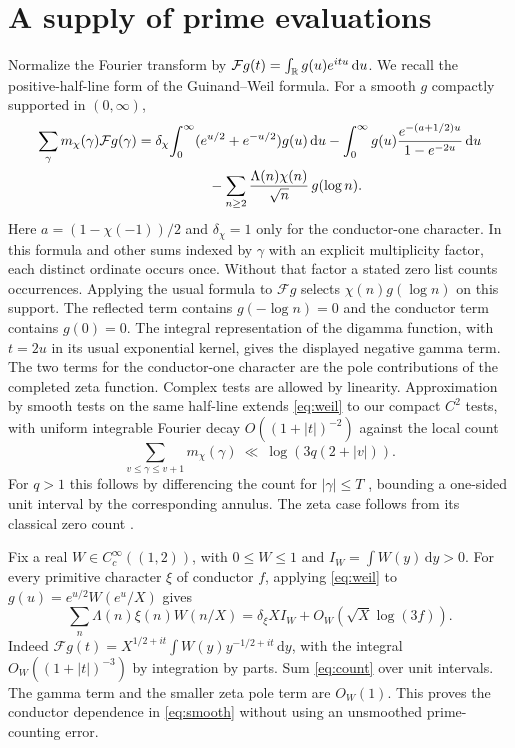 \documentclass[11pt,letterpaper]{article}
\newcommand{\F}{\mathcal F}\newcommand{\Pp}{\mathcal P}
\newcommand{\dd}{\,\mathrm d}
\begin{document}
\section{A supply of prime evaluations}
Normalize the Fourier transform by $\F g(t)=\int_{\R} g(u)e^{itu}\dd u$. We recall the positive-half-line form of the Guinand--Weil formula. For a smooth $g$ compactly supported in $(0,\infty)$,
\begin{align}
 \sum_\gamma m_\chi(\gamma)\F g(\gamma)
 &=\delta_\chi\!\int_0^\infty (e^{u/2}+e^{-u/2})g(u)\dd u
 -\int_0^\infty g(u)\frac{e^{-(a+1/2)u}}{1-e^{-2u}}\dd u \notag\\
 &\hspace{18mm}-\sum_{n\ge2}\frac{\Lambda(n)\chi(n)}{\sqrt n}\,g(\log n).
 \label{eq:weil}
\end{align}
Here $a=(1-\chi(-1))/2$ and $\delta_\chi=1$ only for the conductor-one character. In this formula and other sums indexed by $\gamma$ with an explicit multiplicity factor, each distinct ordinate occurs once. Without that factor a stated zero list counts occurrences. Applying the usual formula \cite[Lemma 9]{carneiro} to $\F g$ selects $\chi(n)g(\log n)$ on this support. The reflected term contains $g(-\log n)=0$ and the conductor term contains $g(0)=0$. The integral representation of the digamma function, with $t=2u$ in its usual exponential kernel, gives the displayed negative gamma term. The two terms for the conductor-one character are the pole contributions of the completed zeta function. Complex tests are allowed by linearity. Approximation by smooth tests on the same half-line extends \eqref{eq:weil} to our compact $C^2$ tests, with uniform integrable Fourier decay $O((1+|t|)^{-2})$ against the local count
\begin{equation}\label{eq:count}
 \sum_{v\le\gamma\le v+1}m_\chi(\gamma)\ \ll\ \log(3q(2+|v|)).
\end{equation}
For $q>1$ this follows by differencing the count for $|\gamma|\le T$ \cite{bennett}, bounding a one-sided unit interval by the corresponding annulus. The zeta case follows from its classical zero count \cite{trudgian}.

Fix a real $W\in C_c^\infty((1,2))$, with $0\le W\le1$ and $I_W=\int W(y)\dd y>0$. For every primitive character $\xi$ of conductor $f$, applying \eqref{eq:weil} to $g(u)=e^{u/2}W(e^u/X)$ gives
\begin{equation}\label{eq:smooth}
 \sum_n\Lambda(n)\xi(n) W(n/X)=\delta_\xi X I_W+O_W(\sqrt X\log(3f)).
\end{equation}
Indeed $\F g(t)=X^{1/2+it}\int W(y)y^{-1/2+it}\dd y$, with the integral $O_W((1+|t|)^{-3})$ by integration by parts. Sum \eqref{eq:count} over unit intervals. The gamma term and the smaller zeta pole term are $O_W(1)$. This proves the conductor dependence in \eqref{eq:smooth} without using an unsmoothed prime-counting error.
\end{document}
